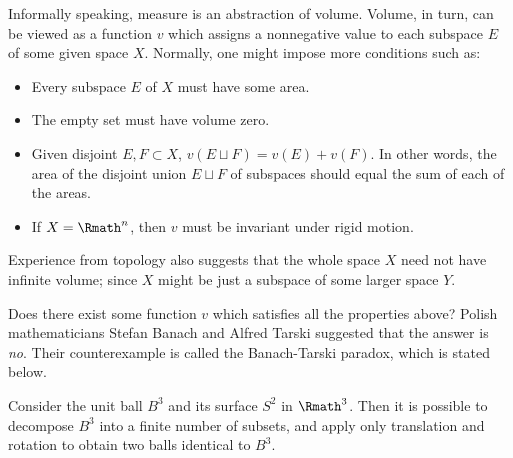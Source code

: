 \label{sec:measure}

Informally speaking, measure is an abstraction of volume.
Volume, in turn, can be viewed as a function \(v\) which assigns
a nonnegative value to each subspace \(E\) of some given space \(X\).
Normally, one might impose more conditions such as:
\begin{itemize}
    \item Every subspace \(E\) of \(X\) must have some area.
    \item The empty set must have volume zero.
    \item Given disjoint \(E,F\subset X\), \(v(E\sqcup F)=v(E)+v(F)\).
    In other words,
    the area of the disjoint union \(E\sqcup F\) of subspaces
    should equal the sum of each of the areas.
    \item If \(X=\Rmath^n\),
    then \(v\) must be invariant under rigid motion.
\end{itemize}
Experience from topology also suggests that
the whole space \(X\) need not have infinite volume;
since \(X\) might be just a subspace of some larger space \(Y\).

Does there exist some function \(v\)
which satisfies all the properties above?
Polish mathematicians Stefan Banach and Alfred Tarski suggested that
the answer is \emph{no}.
Their counterexample is called the Banach-Tarski paradox,
which is stated below.

\begin{example}
    \label{exm:banach-tarski}
    Consider the unit ball \(B^3\) and its surface \(S^2\)
    in \(\Rmath^3\).
    Then it is possible to decompose \(B^3\)
    into a finite number of subsets,
    and apply only translation and rotation
    to obtain two balls identical to \(B^3\).
\end{example}